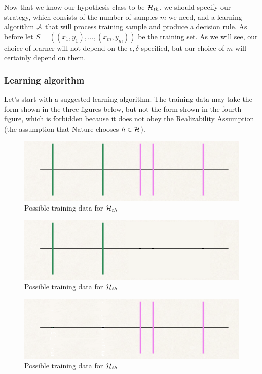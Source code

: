 {Now that we know our hypothesis class to be $\mathcal{H}_{th}$, we should specify our strategy, which consists of the number of samples $m$ we need, and a learning algorithm $\mathcal{A}$ that will process training sample and produce a decision rule. As before let $S=((x_1,y_1),...,(x_m,y_m))$ be the training set. As we will see, our choice of learner will not depend on the $\epsilon, \delta$ specified, but our choice of $m$ will certainly depend on them.

\subsubsection*{Learning algorithm}

Let's start with a suggested learning algorithm.
The training data may take the form shown in the three figures below, but not
the form shown in the fourth figure, which is forbidden because it does not obey
the Realizability Assumption (the assumption that Nature chooses $h\in\mathcal{H}$).

\begin{figure}[h!]
	\centering
	\includegraphics[scale=0.3]{chapters/pac/figures/thresholds1.png}
	\caption{Possible training data for $\mathcal{H}_{th}$}
\end{figure}

\begin{figure}[h!]
	\centering
	\includegraphics[scale=0.3]{chapters/pac/figures/thresholds1a.png}
	\caption{Possible training data for $\mathcal{H}_{th}$}
\end{figure}

\begin{figure}[h!]
	\centering
	\includegraphics[scale=0.3]{chapters/pac/figures/thresholds1b.png}
	\caption{Possible training data for $\mathcal{H}_{th}$}
\end{figure}

}
